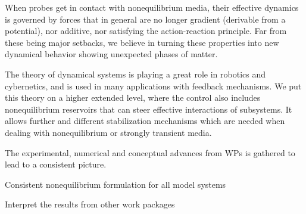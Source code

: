\begin{workpackage}[id=WPcore,wphases=0-48,
  short=Gen. Theory, %
  title=General Theory, %
  lead=KUL,
  KULRM=66,UNIPDRM=8,TUERM=18,ULEIRM=6,USTUTTRM=6]
\begin{mdframed}
\printbibliography[heading=proposal-bib,env=proposal-env]

\end{mdframed}

\begin{tasklist}

\begin{task}[title=Give the theory of statistical forces outside equilibrium,id=core-t1,lead=KUL,partners={UNIPD},wphases={0-24!0.5,12-30}]
When probes get in contact with nonequilibrium media, their effective dynamics is governed
by forces that in general are no longer gradient (derivable from a potential), nor additive,
nor satisfying the action-reaction principle. Far from these being major setbacks, we
believe in turning these properties into new dynamical behavior showing unexpected phases of
matter.
\end{task}

\begin{task}[title=Formulate stability and control theory,id=core-t2,lead=KUL,partners={TUE},wphases={12-36!0.5,36-42}]
The theory of dynamical systems is playing a great role in robotics and cybernetics, and is
used in many applications with feedback mechanisms. We put this theory on a higher extended
level, where the control also includes nonequilibrium reservoirs that can steer effective
interactions of subsystems.
%
It allows further and different stabilization mechanisms which are needed when dealing with
nonequilibrium or strongly transient media.
\end{task}

\begin{task}[title=Consolidate other WPs,id=core-t3,lead=KUL,partners={TUE,UNIPD,USTUTT,TUE},wphases={36-48}]
The experimental, numerical and conceptual advances from WPs is gathered to lead to a
consistent picture.
\end{task}

\end{tasklist}

\begin{wpdelivs}
  \begin{wpdeliv}[due=18,id=core-d1,dissem=PU,nature=R,lead=KUL,miles=framework]
      {Consistent nonequilibrium formulation for all model systems}
  \end{wpdeliv}
  \begin{wpdeliv}[due=36,id=core-d2,dissem=PU,nature=R,lead=KUL,miles=final]
      {Interpret the results from other work packages}
  \end{wpdeliv}
\end{wpdelivs}

\end{workpackage}
